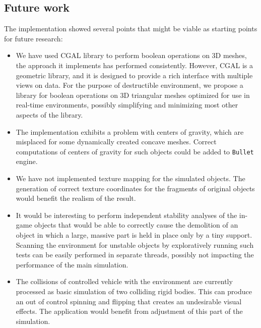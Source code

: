 \subsection*{Future work}
The implementation showed several points that might be viable as starting points for future research:
\begin{itemize}

\item We have used CGAL library to perform boolean operations on 3D meshes, the approach it implements has performed consistently. However, CGAL is a geometric library, and it is designed to provide a rich interface with multiple views on data. For the purpose of destructible environment, we propose a library for boolean operations on 3D triangular meshes optimized for use in real-time environments, possibly simplifying and minimizing most other aspects of the library.

\item The implementation exhibits a problem with centers of gravity, which are misplaced for some dynamically created concave meshes. Correct computations of centers of gravity for such objects could be added to \texttt{Bullet} engine.

\item We have not implemented texture mapping for the simulated objects. The generation of correct texture coordinates for the fragments of original objects would benefit the realism of the result.

\item It would be interesting to perform independent stability analyses of the in-game objects that would be able to \eg correctly cause the demolition of an object in which a large, massive part is held in place only by a tiny support. Scanning the environment for unstable objects by exploratively running such tests can be easily performed in separate threads, \ie possibly not impacting the performance of the main simulation.

\item The collisions of controlled vehicle with the environment are currently processed as basic simulation of two colliding rigid bodies. This can produce an out of control spinning and flipping that creates an undesirable visual effects. The application would benefit from adjustment of this part of the simulation.
\end{itemize}

